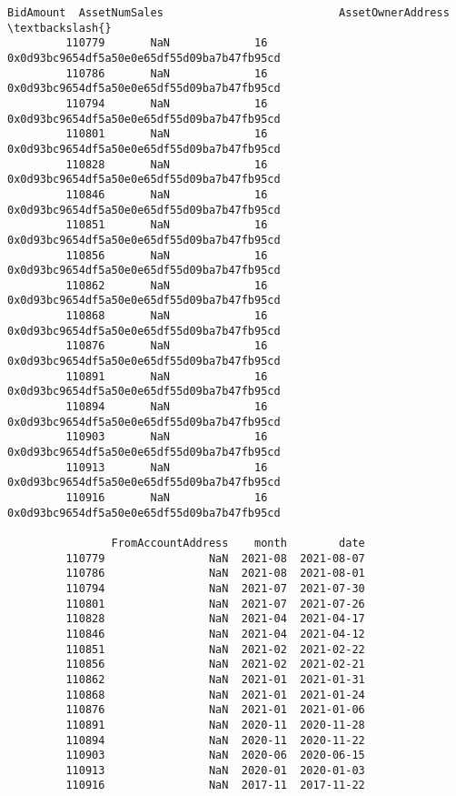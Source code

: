 \documentclass[11pt]{article}
\begin{document}
\begin{Verbatim}[commandchars=\\\{\}]
                BidAmount  AssetNumSales                           AssetOwnerAddress  \textbackslash{}
         110779       NaN             16  0x0d93bc9654df5a50e0e65df55d09ba7b47fb95cd   
         110786       NaN             16  0x0d93bc9654df5a50e0e65df55d09ba7b47fb95cd   
         110794       NaN             16  0x0d93bc9654df5a50e0e65df55d09ba7b47fb95cd   
         110801       NaN             16  0x0d93bc9654df5a50e0e65df55d09ba7b47fb95cd   
         110828       NaN             16  0x0d93bc9654df5a50e0e65df55d09ba7b47fb95cd   
         110846       NaN             16  0x0d93bc9654df5a50e0e65df55d09ba7b47fb95cd   
         110851       NaN             16  0x0d93bc9654df5a50e0e65df55d09ba7b47fb95cd   
         110856       NaN             16  0x0d93bc9654df5a50e0e65df55d09ba7b47fb95cd   
         110862       NaN             16  0x0d93bc9654df5a50e0e65df55d09ba7b47fb95cd   
         110868       NaN             16  0x0d93bc9654df5a50e0e65df55d09ba7b47fb95cd   
         110876       NaN             16  0x0d93bc9654df5a50e0e65df55d09ba7b47fb95cd   
         110891       NaN             16  0x0d93bc9654df5a50e0e65df55d09ba7b47fb95cd   
         110894       NaN             16  0x0d93bc9654df5a50e0e65df55d09ba7b47fb95cd   
         110903       NaN             16  0x0d93bc9654df5a50e0e65df55d09ba7b47fb95cd   
         110913       NaN             16  0x0d93bc9654df5a50e0e65df55d09ba7b47fb95cd   
         110916       NaN             16  0x0d93bc9654df5a50e0e65df55d09ba7b47fb95cd   
         
                FromAccountAddress    month        date  
         110779                NaN  2021-08  2021-08-07  
         110786                NaN  2021-08  2021-08-01  
         110794                NaN  2021-07  2021-07-30  
         110801                NaN  2021-07  2021-07-26  
         110828                NaN  2021-04  2021-04-17  
         110846                NaN  2021-04  2021-04-12  
         110851                NaN  2021-02  2021-02-22  
         110856                NaN  2021-02  2021-02-21  
         110862                NaN  2021-01  2021-01-31  
         110868                NaN  2021-01  2021-01-24  
         110876                NaN  2021-01  2021-01-06  
         110891                NaN  2020-11  2020-11-28  
         110894                NaN  2020-11  2020-11-22  
         110903                NaN  2020-06  2020-06-15  
         110913                NaN  2020-01  2020-01-03  
         110916                NaN  2017-11  2017-11-22  
\end{Verbatim}
            
\end{document}
